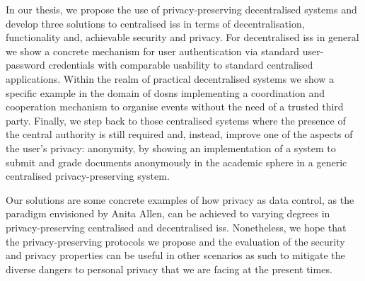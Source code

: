     In our thesis, we propose the use of privacy-preserving decentralised systems 
    and develop three solutions to centralised \aclp*{is} in terms of decentralisation, 
    functionality and, achievable security and privacy. For decentralised \aclp*{is} 
    in general we show a concrete mechanism for user authentication via standard 
    user-password credentials with comparable usability to standard centralised 
    applications. Within the realm of practical decentralised systems we show a 
    specific example in the domain of \aclp*{dosn} implementing a coordination and 
    cooperation mechanism to organise events without the need of a trusted third 
    party. Finally, we step back to those centralised systems where the presence 
    of the central authority is still required and, instead, improve one of the 
    aspects of the user's privacy: anonymity, by showing an implementation of a 
    system to submit and grade documents anonymously in the academic sphere in a 
    generic centralised privacy-preserving system.

    Our solutions are some concrete examples of how privacy as data control, as 
    the paradigm envisioned by Anita Allen, can be achieved to varying degrees in 
    privacy-preserving centralised and decentralised \aclp*{is}. Nonetheless, we 
    hope that the privacy-preserving protocols we propose and the evaluation of 
    the security and privacy properties can be useful in other scenarios as such 
    to mitigate the diverse dangers to personal privacy that we are facing at the 
    present times.
